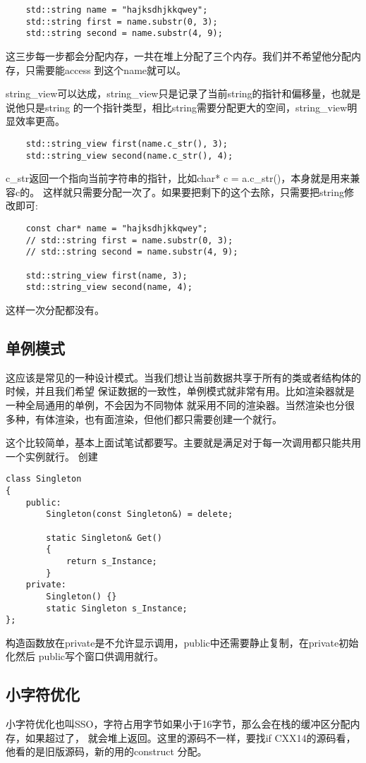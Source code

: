 \documentclass{article}
\begin{document}
\begin{sloppypar}
\begin{lstlisting}
	std::string name = "hajksdhjkkqwey";
    std::string first = name.substr(0, 3);
    std::string second = name.substr(4, 9);
\end{lstlisting}
这三步每一步都会分配内存，一共在堆上分配了三个内存。我们并不希望他分配内存，只需要能access
到这个name就可以。

string\_view可以达成，string\_view只是记录了当前string的指针和偏移量，也就是说他只是string
的一个指针类型，相比string需要分配更大的空间，string\_view明显效率更高。
\begin{lstlisting}
	std::string_view first(name.c_str(), 3);
    std::string_view second(name.c_str(), 4);
\end{lstlisting}
c\_str返回一个指向当前字符串的指针，比如char* c = a.c\_str()，本身就是用来兼容c的。
这样就只需要分配一次了。如果要把剩下的这个去除，只需要把string修改即可:
\begin{lstlisting}
	const char* name = "hajksdhjkkqwey";
    // std::string first = name.substr(0, 3);
    // std::string second = name.substr(4, 9);

    std::string_view first(name, 3);
    std::string_view second(name, 4);
\end{lstlisting}
这样一次分配都没有。

\subsection{单例模式}
这应该是常见的一种设计模式。当我们想让当前数据共享于所有的类或者结构体的时候，并且我们希望
保证数据的一致性，单例模式就非常有用。比如渲染器就是一种全局通用的单例，不会因为不同物体
就采用不同的渲染器。当然渲染也分很多种，有体渲染，也有面渲染，但他们都只需要创建一个就行。

这个比较简单，基本上面试笔试都要写。主要就是满足对于每一次调用都只能共用一个实例就行。
创建
\begin{lstlisting}
class Singleton
{
    public:
        Singleton(const Singleton&) = delete;

        static Singleton& Get()
        {
            return s_Instance;
        }
    private:
        Singleton() {}
        static Singleton s_Instance;
};

\end{lstlisting}
构造函数放在private是不允许显示调用，public中还需要静止复制，在private初始化然后
public写个窗口供调用就行。

\subsection{小字符优化}
小字符优化也叫SSO，字符占用字节如果小于16字节，那么会在栈的缓冲区分配内存，如果超过了，
就会堆上返回。这里的源码不一样，要找if CXX14的源码看，他看的是旧版源码，新的用的construct
分配。


\end{sloppypar}
\end{document}
